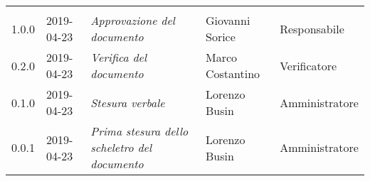 \newpage 
\section*{}
\begin{longtable}{C{2cm}|C{2.5cm}|C{4.5cm}|C{2.5cm}|C{3cm}}
	
	 &  &  &  &   \\
	\endhead
		
		1.0.0 & 2019-04-23 & \emph{Approvazione del documento} & Giovanni Sorice & Responsabile \\
		\hline
		
		 0.2.0 & 2019-04-23 & \emph{Verifica del documento} & Marco Costantino & Verificatore\\
		\hline

		 0.1.0 & 2019-04-23 & \emph{Stesura verbale} & Lorenzo Busin & Amministratore\\
		\hline
		
		 0.0.1 & 2019-04-23 & \emph{Prima stesura dello scheletro del documento} & Lorenzo Busin & Amministratore\\
		
\end{longtable}

\clearpage